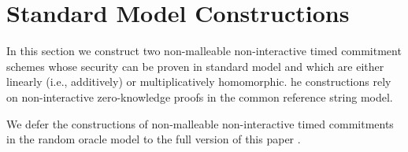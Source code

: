 \section{Standard Model Constructions}
In this section we construct two non-malleable non-interactive timed commitment schemes whose security can be proven in standard model and which are either linearly (i.e., additively) or multiplicatively homomorphic.  he constructions rely on non-interactive zero-knowledge proofs in the common reference string model. 




We defer the constructions of non-malleable non-interactive timed commitments in the random oracle model to the full version of this paper \cite{cryptoeprint:2022/1498}.



